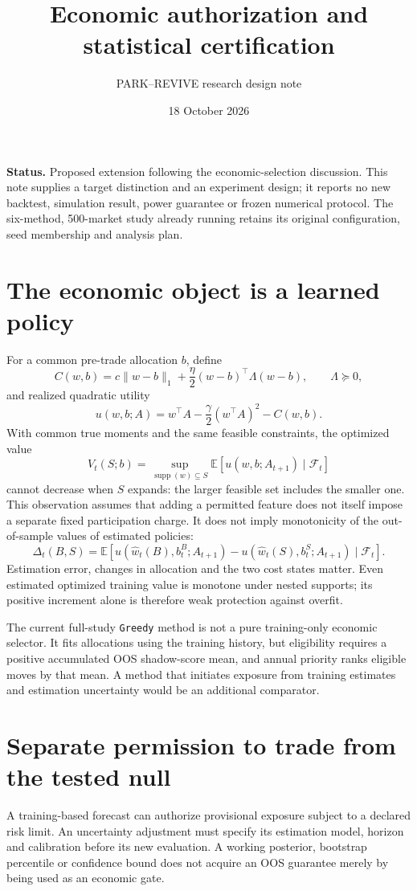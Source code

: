\documentclass[11pt,a4paper]{article}
\title{Economic authorization and statistical certification}
\author{PARK--REVIVE research design note}
\date{18 October 2026}
\newcommand{\E}{\mathbb E}
\newcommand{\F}{\mathcal F}
\begin{document}
\maketitle
\noindent\textbf{Status.} Proposed extension following the economic-selection
discussion. This note supplies a target distinction and an experiment design;
it reports no new backtest, simulation result, power guarantee or frozen
numerical protocol. The six-method, 500-market study already running retains
its original configuration, seed membership and analysis plan.

\section{The economic object is a learned policy}
For a common pre-trade allocation $b$, define
\[
 C(w,b)=c\|w-b\|_1+\frac{\eta}{2}(w-b)^\top\Lambda(w-b),
 \qquad \Lambda\succeq0,
\]
and realized quadratic utility
\[
 u(w,b;A)=w^\top A-\frac{\gamma}{2}(w^\top A)^2-C(w,b).
\]
With common true moments and the same feasible constraints, the optimized
value
\[
 V_t(S;b)=\sup_{\operatorname{supp}(w)\subseteq S}
             \E[u(w,b;A_{t+1})\mid\F_t]
\]
cannot decrease when $S$ expands: the larger feasible set includes the
smaller one. This observation assumes that adding a permitted feature does
not itself impose a separate fixed participation charge. It does not imply
monotonicity of the out-of-sample values of estimated policies:
\[
 \Delta_t(B,S)=
 \E\!\left[
 u(\widehat w_t(B),b^B_t;A_{t+1})
 -u(\widehat w_t(S),b^S_t;A_{t+1})\mid\F_t\right].
\]
Estimation error, changes in allocation and the two cost states matter.
Even estimated optimized training value is monotone under nested supports;
its positive increment alone is therefore weak protection against overfit.

The current full-study \texttt{Greedy} method is not a pure training-only
economic selector. It fits allocations using the training history, but
eligibility requires a positive accumulated OOS shadow-score mean, and
annual priority ranks eligible moves by that mean. A method that initiates
exposure from training estimates and estimation uncertainty would be an
additional comparator.

\section{Separate permission to trade from the tested null}
A training-based forecast can authorize provisional exposure subject to a
declared risk limit. An uncertainty adjustment must specify its estimation
model, horizon and calibration before its new evaluation. A working posterior,
bootstrap percentile or confidence bound does not acquire an OOS guarantee
merely by being used as an economic gate.
\end{document}
